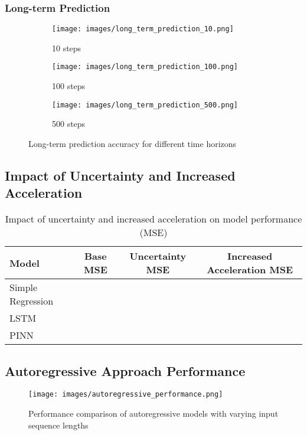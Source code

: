 \documentclass[12pt,a4paper]{article}
\begin{document}
\subsubsection{Long-term Prediction}
\begin{figure}[h]
    \centering
    \begin{subfigure}[b]{0.3\textwidth}
        \texttt{[image: images/long\_term\_prediction\_10.png]}
        \caption{10 steps}
    \end{subfigure}
    \begin{subfigure}[b]{0.3\textwidth}
        \texttt{[image: images/long\_term\_prediction\_100.png]}
        \caption{100 steps}
    \end{subfigure}
    \begin{subfigure}[b]{0.3\textwidth}
        \texttt{[image: images/long\_term\_prediction\_500.png]}
        \caption{500 steps}
    \end{subfigure}
    \caption{Long-term prediction accuracy for different time horizons}
    \label{fig:long_term_prediction}
\end{figure}

\subsection{Impact of Uncertainty and Increased Acceleration}

\begin{table}[h]
    \centering
    \begin{tabular}{lccc}
        \hline
        Model & Base MSE & Uncertainty MSE & Increased Acceleration MSE \\
        \hline
        Simple Regression & & & \\
        LSTM & & & \\
        PINN & & & \\
        \hline
    \end{tabular}
    \caption{Impact of uncertainty and increased acceleration on model performance (MSE)}
    \label{tab:uncertainty_acceleration_impact}
\end{table}

\subsection{Autoregressive Approach Performance}

\begin{figure}[h]
    \centering
    \texttt{[image: images/autoregressive\_performance.png]}
    \caption{Performance comparison of autoregressive models with varying input sequence lengths}
    \label{fig:autoregressive_performance}
\end{figure}
\end{document}
